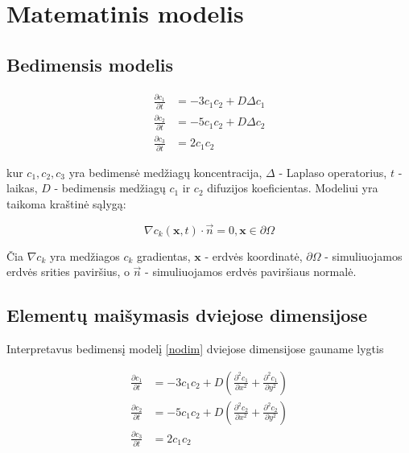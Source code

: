 
\section{Matematinis modelis}

\subsection{Bedimensis modelis}

\begin{subequations} \label{nodim}
    \begin{align}
    \frac{\partial c_1}{\partial t}&=-3c_1c_2+D\Delta c_1 \label{nodim1}\\
    \frac{\partial c_2}{\partial t}&=-5c_1c_2+D\Delta c_2 \label{nodim2}\\
    \frac{\partial c_3}{\partial t}&=2c_1c_2
    \end{align}
\end{subequations}

kur $c_1,c_2,c_3$ yra bedimensė medžiagų koncentracija, 
$\Delta$ - Laplaso operatorius, $t$ - laikas, 
$D$ - bedimensis medžiagų $c_1$ ir $c_2$ difuzijos koeficientas. Modeliui yra taikoma kraštinė sąlygą:

\begin{equation} \label{general-boundary-cond}
  \nabla c_k(\textbf{x}, t)\cdot\vec{n}=0, \textbf{x}\in\partial\Omega
\end{equation}

Čia $\nabla c_k$ yra medžiagos $c_k$ gradientas, $\textbf{x}$ - erdvės koordinatė, $\partial\Omega$ - simuliuojamos erdvės srities paviršius, o $\vec{n}$ - simuliuojamos erdvės paviršiaus normalė.

\subsection{Elementų maišymasis dviejose dimensijose}

Interpretavus bedimensį modelį \eqref{nodim} dviejose dimensijose gauname lygtis

\begin{subequations} \label{rect}
    \begin{align}
    \frac{\partial c_1}{\partial t}&=-3c_1c_2+D\left(\frac{\partial^2c_1}{\partial x^2}+\frac{\partial^2c_1}{\partial y^2}\right)\\
    \frac{\partial c_2}{\partial t}&=-5c_1c_2+D\left(\frac{\partial^2c_2}{\partial x^2}+\frac{\partial^2c_2}{\partial y^2}\right)\\
    \frac{\partial c_3}{\partial t}&=2c_1c_2
    \end{align}
\end{subequations}

